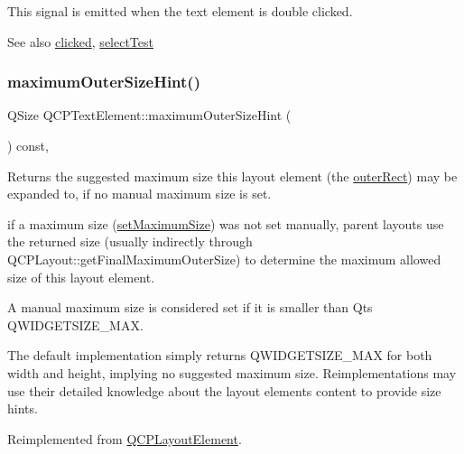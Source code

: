 This signal is emitted when the text element is double clicked.

\begin{DoxySeeAlso}{See also}
\hyperlink{classQCPTextElement_ad2246a0e701c0655623f048737298334}{clicked}, \hyperlink{classQCPTextElement_a1e721bc2994a127ef5a8f0a514a5dbac}{select\+Test} 
\end{DoxySeeAlso}
\mbox{\label{classQCPTextElement_ae82475b50c10a5b3314d996d50ae536b}} 
\subsubsection{\texorpdfstring{maximum\+Outer\+Size\+Hint()}{maximumOuterSizeHint()}}
{\footnotesize\ttfamily Q\+Size Q\+C\+P\+Text\+Element\+::maximum\+Outer\+Size\+Hint (\begin{DoxyParamCaption}{ }\end{DoxyParamCaption}) const\hspace{0.3cm}{\ttfamily [protected]}, {\ttfamily [virtual]}}

Returns the suggested maximum size this layout element (the \hyperlink{classQCPLayoutElement_a2a32a12a6161c9dffbadeb9cc585510c}{outer\+Rect}) may be expanded to, if no manual maximum size is set.

if a maximum size (\hyperlink{classQCPLayoutElement_a74eb5280a737ab44833d506db65efd95}{set\+Maximum\+Size}) was not set manually, parent layouts use the returned size (usually indirectly through Q\+C\+P\+Layout\+::get\+Final\+Maximum\+Outer\+Size) to determine the maximum allowed size of this layout element.

A manual maximum size is considered set if it is smaller than Qt\textquotesingle{}s {\ttfamily Q\+W\+I\+D\+G\+E\+T\+S\+I\+Z\+E\+\_\+\+M\+AX}.

The default implementation simply returns {\ttfamily Q\+W\+I\+D\+G\+E\+T\+S\+I\+Z\+E\+\_\+\+M\+AX} for both width and height, implying no suggested maximum size. Reimplementations may use their detailed knowledge about the layout element\textquotesingle{}s content to provide size hints. 

Reimplemented from \hyperlink{classQCPLayoutElement_ad96efb977a26e360e8a64a4c1e56456d}{Q\+C\+P\+Layout\+Element}.


